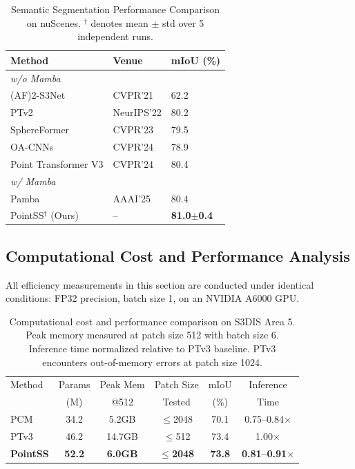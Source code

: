 \documentclass[a4paper,fleqn]{cas-sc}
\begin{document}
\begin{table}
	\centering
	\caption{Semantic Segmentation Performance Comparison on nuScenes. $^\dagger$ denotes mean $\pm$ std over 5 independent runs.}
	\label{tab:nuscenes}
	\begin{tabular}{@{}lll@{}}
		\toprule
		\textbf{Method} & \textbf{Venue} & \textbf{mIoU (\%)} \\ \midrule
		\multicolumn{3}{l}{\textit{w/o Mamba}} \\
		(AF)2-S3Net \cite{af2s3net} & CVPR'21 & 62.2 \\
		PTv2 \cite{ptv2} & NeurIPS'22 & 80.2 \\
		SphereFormer \cite{sphereformer} & CVPR'23 & 79.5 \\
		OA-CNNs \cite{oacnn} & CVPR'24 & 78.9 \\
		Point Transformer V3 \cite{ptv3} & CVPR'24 & 80.4 \\ \midrule
		\multicolumn{3}{l}{\textit{w/ Mamba}} \\
		Pamba \cite{pamba} & AAAI'25 & 80.4 \\
		PointSS$^\dagger$ (Ours) & -- & \textbf{81.0$\pm$0.4} \\ \bottomrule
	\end{tabular}
\end{table}

\subsection{Computational Cost and Performance Analysis}

All efficiency measurements in this section are conducted under identical conditions: FP32 precision, batch size 1, on an NVIDIA A6000 GPU.

\begin{table}[t]
\centering
\caption{Computational cost and performance comparison on S3DIS Area 5. Peak memory measured at patch size 512 with batch size 6. Inference time normalized relative to PTv3 baseline. PTv3 encounters out-of-memory errors at patch size 1024.}
\label{tab:efficiency}
\begin{tabular}{lccccc}
\toprule
Method & Params & Peak Mem & Patch Size & mIoU & Inference \\
       & (M)    & @512     & Tested     & (\%)  & Time \\
\midrule
PCM    & 34.2   & 5.2GB    & $\leq$2048      & 70.1  & 0.75--0.84$\times$ \\
PTv3   & 46.2   & 14.7GB   & $\leq$512       & 73.4  & 1.00$\times$ \\
\textbf{PointSS} & \textbf{52.2} & \textbf{6.0GB} & \textbf{$\leq$2048} & \textbf{73.8} & \textbf{0.81--0.91}$\times$ \\
\bottomrule
\end{tabular}
\end{table}
\end{document}
